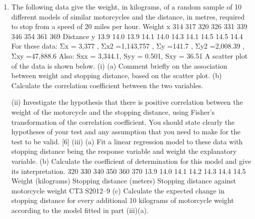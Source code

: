 \documentclass[a4paper,12pt]{article}
\begin{document}
\begin{enumerate}


\item The following data give the weight, in kilograms, of a random sample of 10 different
models of similar motorcycles and the distance, in metres, required to stop from a
speed of 20 miles per hour.
Weight x 314 317 320 326 331 339 346 354 361 369
Distance y 13.9 14.0 13.9 14.1 14.0 14.3 14.1 14.5 14.5 14.4
For these data: Σx = 3,377 , Σx2 =1,143,757 , Σy =141.7 ,
Σy2 =2,008.39 , Σxy =47,888.6
Also: Sxx = 3,344.1, Syy = 0.501, Sxy = 36.51
A scatter plot of the data is shown below.
(i) (a) Comment briefly on the association between weight and stopping
distance, based on the scatter plot.
(b) Calculate the correlation coefficient between the two variables.

(ii) Investigate the hypothesis that there is positive correlation between the weight
of the motorcycle and the stopping distance, using Fisher’s transformation of
the correlation coefficient. You should state clearly the hypotheses of your
test and any assumption that you need to make for the test to be valid. [6]
(iii) (a) Fit a linear regression model to these data with stopping distance being
the response variable and weight the explanatory variable.
(b) Calculate the coefficient of determination for this model and give its
interpretation.
320 330 340 350 360 370
13.9 14.0 14.1 14.2 14.3 14.4 14.5
Weight (kilograms)
Stopping distance (meters)
Stopping distance against motorcycle weight
CT3 S2012–9
(c) Calculate the expected change in stopping distance for every additional
10 kilograms of motorcycle weight according to the model fitted in
part (iii)(a).


\end{enumerate}
\end{document}
